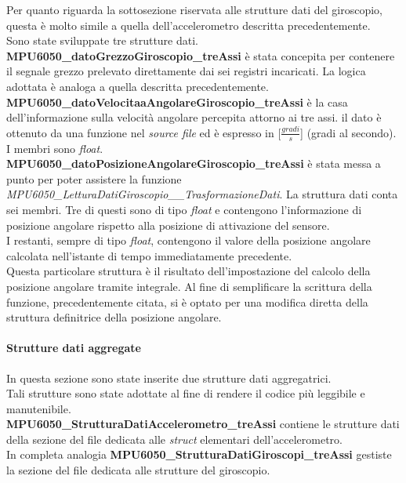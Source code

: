 \documentclass[11pt]{report}
\begin{document}
\newpage

Per quanto riguarda la sottosezione riservata alle strutture dati del giroscopio, questa è  molto simile a quella dell'accelerometro descritta precedentemente.\\
Sono state sviluppate tre strutture dati.\\
\textbf{MPU6050\_datoGrezzoGiroscopio\_treAssi} è stata concepita per contenere il segnale grezzo prelevato direttamente dai sei registri incaricati. La logica adottata è analoga a quella descritta precedentemente.\\
\textbf{MPU6050\_datoVelocitaaAngolareGiroscopio\_treAssi} è la casa dell'informazione sulla velocità angolare percepita attorno ai tre assi. il dato è ottenuto da una funzione nel \textit{source file} ed è espresso in [$\frac{gradi}{s}$] (gradi al secondo). I membri sono \textit{float}.\\
\textbf{MPU6050\_datoPosizioneAngolareGiroscopio\_treAssi} è stata messa a punto per poter assistere la funzione \textit{MPU6050\_LetturaDatiGiroscopio\_\_TrasformazioneDati}. La struttura dati conta sei membri. Tre di questi sono di tipo \textit{float} e contengono l'informazione di posizione angolare rispetto alla posizione di attivazione del sensore.\\
I restanti, sempre di tipo \textit{float}, contengono il valore della posizione angolare calcolata nell'istante di tempo immediatamente precedente.\\
Questa particolare struttura è il risultato dell'impostazione del calcolo della posizione angolare tramite integrale. Al fine di semplificare la scrittura della funzione, precedentemente citata, si è optato per una modifica diretta della struttura definitrice della posizione angolare.


\paragraph{Strutture dati aggregate}
In questa sezione sono state inserite due strutture dati aggregatrici.\\
Tali strutture sono state adottate al fine di rendere il codice più leggibile e manutenibile.\\
\textbf{MPU6050\_StrutturaDatiAccelerometro\_treAssi} contiene le strutture dati della sezione del file dedicata alle \textit{struct} elementari dell'accelerometro.\\In completa analogia
\textbf{MPU6050\_StrutturaDatiGiroscopi\_treAssi} gestiste la sezione del file dedicata alle strutture del giroscopio.

\end{document}
